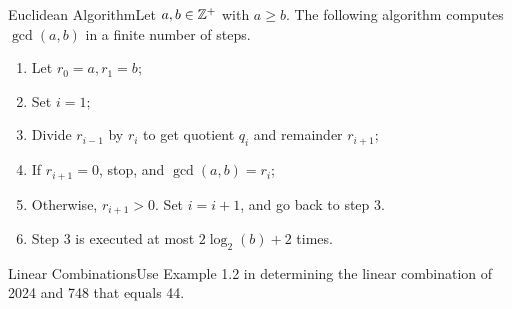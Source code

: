 


\begin{theorem}
    {Euclidean Algorithm}Let \(a,b \in \mathbb{Z}^+\) with \(a \geq b\). The following algorithm computes \(\gcd(a,b)\) in a finite number of steps. \begin{enumerate}
        \item Let \(r_0 = a, r_1 = b\);
        \item Set \(i = 1\);
        \item Divide \(r_{i - 1}\) by \(r_i\) to get quotient \(q_i\) and remainder \(r_{i + 1}\);
        \item If \(r_{i + 1} = 0\), stop, and \(\gcd(a,b) = r_i\);
        \item Otherwise, \(r_{i + 1} > 0\). Set \(i = i + 1\), and go back to step 3.
        \item Step 3 is executed at most \(2\log_2(b) + 2\) times.
    \end{enumerate}
\end{theorem}

\begin{example}
    {Linear Combinations}Use Example 1.2 in determining the linear combination of 2024 and 748 that equals 44.
\end{example}

